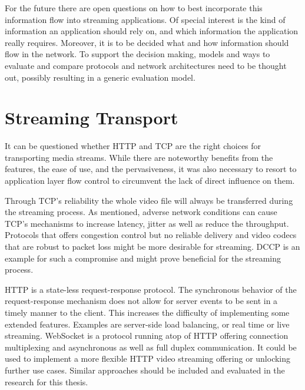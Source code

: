 For the future there are open questions on how to best incorporate this information flow into streaming applications. Of special interest is the kind of information an application should rely on, and which information the application really requires. Moreover, it is to be decided what and how information should flow in the network. To support the decision making, models and ways to evaluate and compare protocols and network architectures need to be thought out, possibly resulting in a generic evaluation model.





\section{Streaming Transport}

It can be questioned whether HTTP and TCP are the right choices for transporting media streams.
While there are noteworthy benefits from the features, the ease of use, and the pervasiveness, it was also necessary to resort to application layer flow control to circumvent the lack of direct influence on them.

Through TCP's reliability the whole video file will always be transferred during the streaming process. As mentioned, adverse network conditions can cause TCP's mechanisms to increase latency, jitter as well as reduce the throughput. Protocols that offers congestion control but no reliable delivery and video codecs that are robust to packet loss might be more desirable for streaming. DCCP \cite{kohler2006designing} is an example for such a compromise and might prove beneficial for the streaming process.

HTTP is a state-less request-response protocol. The synchronous behavior of the request-response mechanism does not allow for server events to be sent in a timely manner to the client. This increases the difficulty of implementing some extended features. Examples are server-side load balancing, or real time or live streaming. WebSocket \cite{ietf2011websocket, websocketwww} is a protocol running atop of HTTP offering connection multiplexing and asynchronous as well as full duplex communication. It could be used to implement a more flexible HTTP video streaming offering or unlocking further use cases. Similar approaches should be included and evaluated in the research for this thesis.



